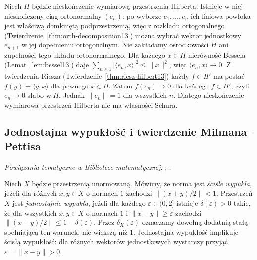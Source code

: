 \begin{przyklad}
\label{ex:en-hilbert26}
Niech $H$ będzie nieskończenie wymiarową przestrzenią Hilberta.
Istnieje w niej nieskończony ciąg ortonormalny $(e_n)$:
po wyborze $e_1,\ldots,e_n$ ich liniowa powłoka jest
właściwą domkniętą podprzestrzenią, więc z rozkładu
ortogonalnego (Twierdzenie~\ref{thm:orth-decomposition13})
można wybrać wektor jednostkowy $e_{n+1}$
w jej dopełnieniu ortogonalnym. Nie zakładamy
ośrodkowości $H$ ani zupełności tego układu ortonormalnego.
Dla każdego $x\in H$ nierówność Bessela
(Lemat~\ref{lem:bessel13}) daje
$\sum_{n\ge1}|\langle e_n,x\rangle|^2\le\|x\|^2$,
więc $\langle e_n,x\rangle\to0$.
Z twierdzenia Riesza
(Twierdzenie~\ref{thm:riesz-hilbert13}) każdy $f\in H'$
ma postać $f(y)=\langle y,x\rangle$ dla pewnego $x\in H$.
Zatem $f(e_n)\to0$ dla każdego $f\in H'$, czyli
$e_n\to0$ słabo w $H$. Jednak $\|e_n\|=1$
dla wszystkich $n$.
Dlatego nieskończenie wymiarowa przestrzeń Hilberta
nie ma własności Schura.
\end{przyklad}

\subsection{Jednostajna wypukłość i twierdzenie Milmana--Pettisa}

\noindent\emph{Powiązania tematyczne w Bibliotece matematycznej:} ; .


\begin{definicja}
\label{def:uniform-convex26}
Niech $X$ będzie przestrzenią unormowaną.
Mówimy, że norma jest \emph{ściśle wypukła}, jeżeli
dla różnych $x,y\in X$ o normach $1$ zachodzi
$\|(x+y)/2\|<1$.
Przestrzeń $X$ jest \emph{jednostajnie wypukła}, jeżeli
dla każdego $\varepsilon\in(0,2]$ istnieje
$\delta(\varepsilon)>0$ takie, że dla wszystkich
$x,y\in X$ o normach $1$ i $\|x-y\|\ge\varepsilon$
zachodzi $\|(x+y)/2\|\le1-\delta(\varepsilon)$.
Przez $\delta_X(\varepsilon)$ oznaczamy dowolną
dodatnią stałą spełniającą ten warunek, nie większą
niż $1$. Jednostajna wypukłość implikuje ścisłą
wypukłość: dla różnych wektorów jednostkowych
wystarczy przyjąć $\varepsilon=\|x-y\|>0$.
\end{definicja}

